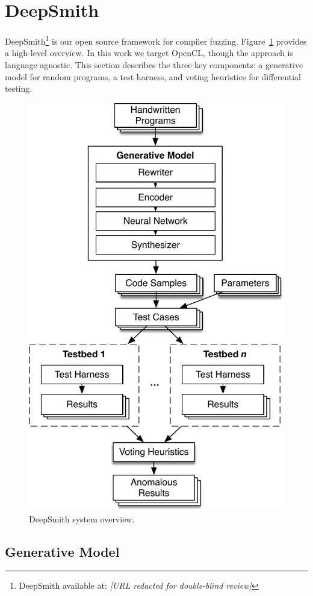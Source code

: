 \section{DeepSmith}

DeepSmith\footnote{DeepSmith available at: \emph{[URL redacted for double-blind review]}} is our open source framework for compiler fuzzing. Figure~\ref{fig:deeptune} provides a high-level overview. In this work we target OpenCL, though the approach is language agnostic. This section describes the three key components: a generative model for random programs, a test harness, and voting heuristics for differential testing.

\begin{figure}
  \centering
  \includegraphics[width=.80\columnwidth]{img/deepsmith} %
  \caption{%
    DeepSmith system overview.
  }%
  \label{fig:deeptune}
\end{figure}

\subsection{Generative Model}

